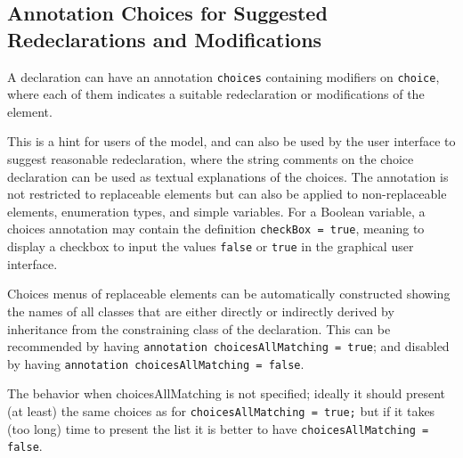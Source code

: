 \subsection{Annotation Choices for Suggested Redeclarations and Modifications}

A declaration can have an annotation \lstinline!choices! containing modifiers on
\lstinline!choice!, where each of them indicates a suitable redeclaration or
modifications of the element.

This is a hint for users of the model, and can also be used by the user
interface to suggest reasonable redeclaration, where the string comments
on the choice declaration can be used as textual explanations of the
choices. The annotation is not restricted to replaceable elements but
can also be applied to non-replaceable elements, enumeration types, and
simple variables. For a Boolean variable, a choices annotation may
contain the definition \lstinline!checkBox = true!, meaning to display a checkbox to
input the values \lstinline!false! or \lstinline!true! in the graphical user interface.

Choices menus of replaceable elements can be automatically constructed
showing the names of all classes that are either directly or indirectly
derived by inheritance from the constraining class of the declaration.
This can be recommended by having \lstinline!annotation choicesAllMatching = true!; and disabled by having
\lstinline!annotation choicesAllMatching = false!.
\begin{nonnormative}
The behavior when choicesAllMatching is not specified;
ideally it should present (at least) the same choices as for
\lstinline!choicesAllMatching = true;! but if it takes (too long) time to present
the list it is better to have \lstinline!choicesAllMatching = false!.
\end{nonnormative}

